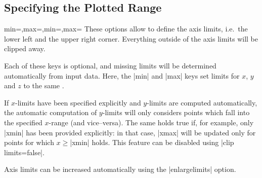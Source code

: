 

\subsection{Specifying the Plotted Range}

\begin{pgfplotsxykeylist}{\x min=,\x max=,min=,max=}
These options allow to define the axis limits, i.e.\ the lower left and the upper right corner. Everything outside of the axis limits will be clipped away.

Each of these keys is optional, and missing limits will be determined automatically from input data. Here, the |min| and |max| keys set limits for $x$, $y$ and $z$ to the same .

If $x$-limits have been specified explicitly and $y$-limits are computed automatically, the automatic computation of $y$-limits will only considers points which fall into the specified $x$-range (and vice--versa). The same holds true if, for example, only |xmin| has been provided explicitly: in that case, |xmax| will be updated only for points for which $x \ge $|xmin| holds. This feature can be disabled using |clip limits=false|. 

Axis limits can be increased automatically using the |enlargelimits| option.
\begin{codeexample}[]
\end{codeexample}

\begin{codeexample}[]
\end{codeexample}

\begin{codeexample}[]
\end{codeexample}
\end{pgfplotsxykeylist}

